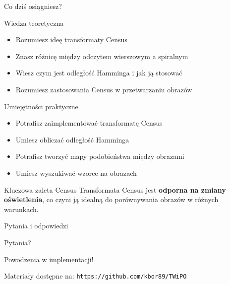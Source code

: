 \documentclass[9pt]{beamer}
\begin{document}
\begin{frame}{Co dziś osiągniesz?}
\begin{block}{Wiedza teoretyczna}
\begin{itemize}
\item Rozumiesz ideę transformaty Census
\item Znasz różnicę między odczytem wierszowym a spiralnym
\item Wiesz czym jest odległość Hamminga i jak ją stosować
\item Rozumiesz zastosowania Census w przetwarzaniu obrazów
\end{itemize}
\end{block}

\begin{block}{Umiejętności praktyczne}
\begin{itemize}
\item Potrafisz zaimplementować transformatę Census
\item Umiesz obliczać odległość Hamminga
\item Potrafisz tworzyć mapy podobieństwa między obrazami
\item Umiesz wyszukiwać wzorce na obrazach
\end{itemize}
\end{block}

\begin{alertblock}{Kluczowa zaleta Census}
Transformata Census jest \textbf{odporna na zmiany oświetlenia}, co czyni ją idealną do porównywania obrazów w różnych warunkach.
\end{alertblock}

\end{frame}

\begin{frame}{Pytania i odpowiedzi}
\begin{center}
\Huge Pytania?

\vspace{1cm}

\Large Powodzenia w implementacji!

\vspace{1cm}

\normalsize
Materiały dostępne na:
\texttt{https://github.com/kbor89/TWiPO}
\end{center}

\end{frame}
\end{document}
